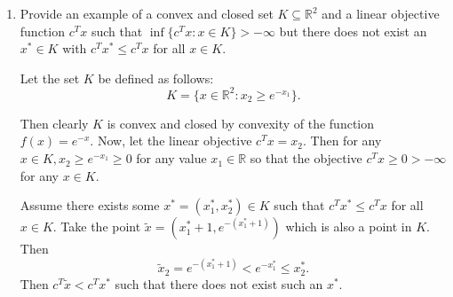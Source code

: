 \documentclass[11pt]{article}
\newcommand{\setR}{\mathbb{R}}
\renewcommand{\leq}{\leqslant}
\renewcommand{\geq}{\geqslant}
\begin{document}
\begin{enumerate}[1)]
\begin{solution}
\end{solution}
  
  
  \item Provide an example of a convex and closed  set $K\subseteq\setR^2$ and a
  linear objective function $c^Tx$ such that $\inf\{c^Tx \colon
  x\in K\}>-\infty$ but there does not exist an $x^* \in K$ with $c^Tx^* \leq
  c^Tx$ for all $x \in K$. 
  
  
  \begin{solution}
  Let the set $K$ be defined as follows:
  $$K = \{x \in \setR^2: x_2 \geq e^{-x_1} \}.$$
  
  
  Then clearly $K$ is convex and closed by convexity of the function $f(x) = e^{-x}$. Now, let the linear objective $c^Tx = x_2$. Then for any $x \in K, x_2 \geq e^{-x_1} \geq 0$ for any value $x_1 \in \setR$ so that the objective $c^Tx \geq 0 > -\infty$ for any $x \in K$. 
  
  
 Assume there exists some $x^\ast = (x^\ast_1, x^\ast_2) \in K$ such that $c^Tx^\ast \leq c^Tx$ for all $x \in K$. Take the point $\tilde{x} = (x^\ast_1  + 1, e^{-(x^\ast_1 + 1)})$ which is also a point in $K$. Then $$\tilde{x}_2 = e^{-(x^\ast_1 + 1)} < e^{-x^\ast_1} \leq x^\ast_2.$$ Then $c^T \tilde{x} < c^T x^\ast$ such that there does not exist such an $x^\ast$. 
  
  
  \end{solution}
  
  
  


\end{enumerate}
\end{document}
